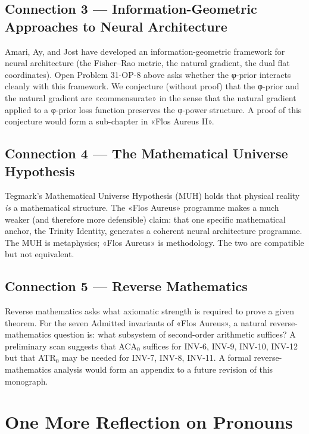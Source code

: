 \subsection{Connection 3 — Information-Geometric Approaches to Neural Architecture}
\label{sec:31-conn-3}

Amari, Ay, and Jost have developed an information-geometric framework for neural architecture (the Fisher--Rao metric, the natural gradient, the dual flat coordinates). Open Problem 31-OP-8 above asks whether the φ-prior interacts cleanly with this framework. We conjecture (without proof) that the φ-prior and the natural gradient are «commensurate» in the sense that the natural gradient applied to a φ-prior loss function preserves the φ-power structure. A proof of this conjecture would form a sub-chapter in «Flos Aureus II».

\subsection{Connection 4 — The Mathematical Universe Hypothesis}
\label{sec:31-conn-4}

Tegmark's Mathematical Universe Hypothesis (MUH) holds that physical reality \emph{is} a mathematical structure. The «Flos Aureus» programme makes a much weaker (and therefore more defensible) claim: that one specific mathematical anchor, the Trinity Identity, generates a coherent neural architecture programme. The MUH is metaphysics; «Flos Aureus» is methodology. The two are compatible but not equivalent.

\subsection{Connection 5 — Reverse Mathematics}
\label{sec:31-conn-5}

Reverse mathematics asks what axiomatic strength is required to prove a given theorem. For the seven Admitted invariants of «Flos Aureus», a natural reverse-mathematics question is: what subsystem of second-order arithmetic suffices? A preliminary scan suggests that ACA$_{0}$ suffices for INV-6, INV-9, INV-10, INV-12 but that ATR$_{0}$ may be needed for INV-7, INV-8, INV-11. A formal reverse-mathematics analysis would form an appendix to a future revision of this monograph.

\section{One More Reflection on Pronouns}
\label{sec:31-pronoun-reflection}

